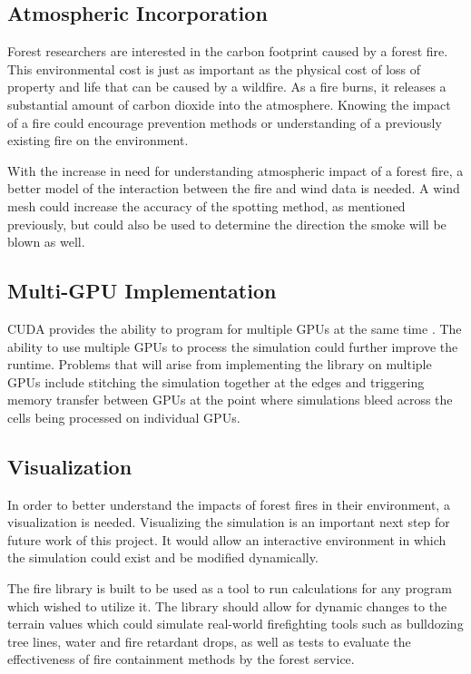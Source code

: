 \subsection{Atmospheric Incorporation}
Forest researchers are interested in the carbon footprint caused by a forest fire. This environmental cost is just as important as the physical cost of loss of property and life that can be caused by a wildfire. As a fire burns, it releases a substantial amount of carbon dioxide into the atmosphere. Knowing the impact of a fire could encourage prevention methods or understanding of a previously existing fire on the environment. 

With the increase in need for understanding atmospheric impact of a forest fire, a better model of the interaction between the fire and wind data is needed. A wind mesh could increase the accuracy of the spotting method, as mentioned previously, but could also be used to determine the direction the smoke will be blown as well.

\subsection{Multi-GPU Implementation} 
CUDA provides the ability to program for multiple GPUs at the same time \cite{cuda}. The ability to use multiple GPUs to process the simulation could further improve the runtime. Problems that will arise from implementing the library on multiple GPUs include stitching the simulation together at the edges and triggering memory transfer between GPUs at the point where simulations bleed across the cells being processed on individual GPUs. 

\subsection{Visualization}
In order to better understand the impacts of forest fires in their environment, a visualization is needed. Visualizing the simulation is an important next step for future work of this project. It would allow an interactive environment in which the simulation could exist and be modified dynamically. 

The fire library is built to be used as a tool to run calculations for any program which wished to utilize it. The library should allow for dynamic changes to the terrain values which could simulate real-world firefighting tools such as bulldozing tree lines, water and fire retardant drops, as well as tests to evaluate the effectiveness of fire containment methods by the forest service. 